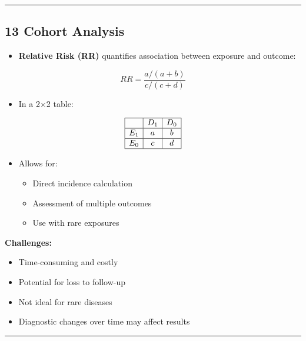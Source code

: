\documentclass[
  letterpaper,
  DIV=11,
  numbers=noendperiod]{scrartcl}
\providecommand{\tightlist}{%
  \setlength{\itemsep}{0pt}\setlength{\parskip}{0pt}}
\begin{document}
\begin{center}\rule{0.5\linewidth}{0.5pt}\end{center}

\subsection{\texorpdfstring{{13} {Cohort
Analysis}}{13 Cohort Analysis}}\label{cohort-analysis}

\begin{itemize}
\tightlist
\item
  \textbf{Relative Risk (RR)} quantifies association between exposure
  and outcome:
\end{itemize}

\[RR = \frac{a/(a+b)}{c/(c+d)}\]

\begin{itemize}
\tightlist
\item
  In a 2×2 table:
\end{itemize}

\[
\begin{array}{|c|c|c|} \hline
 & D_1 & D_0 \\ \hline
E_1 & a & b \\ \hline
E_0 & c & d \\ \hline
\end{array}
\]

\begin{itemize}
\tightlist
\item
  Allows for:

  \begin{itemize}
  \tightlist
  \item
    Direct incidence calculation
  \item
    Assessment of multiple outcomes
  \item
    Use with rare exposures
  \end{itemize}
\end{itemize}

\textbf{Challenges:}

\begin{itemize}
\item
  Time-consuming and costly
\item
  Potential for loss to follow-up
\item
  Not ideal for rare diseases
\item
  Diagnostic changes over time may affect results
\end{itemize}

\begin{center}\rule{0.5\linewidth}{0.5pt}\end{center}
\end{document}

